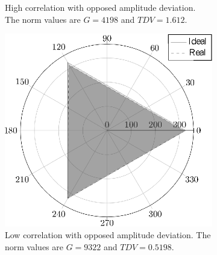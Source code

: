 \begin{figure}
\begin{subfigure}[b]{0.48\textwidth}
                    \caption{\centering High correlation with opposed amplitude deviation. The norm values are $G=4198$ and $TDV=1.612$.}
                    \label{fig:cases_B}
                \end{subfigure}
                \begin{subfigure}[b]{0.48\textwidth}
                    \includegraphics[width=\textwidth]{Unblance_EPS_Pics/EPS_images/square.eps}
                    \caption{Low correlation with opposed amplitude deviation. The norm values are $G=9322$ and $TDV=0.5198$.}
                    \label{fig:cases_C}
                \end{subfigure}
                ~
                \begin{subfigure}[b]{0.48\textwidth}

\end{subfigure}
\end{figure}
